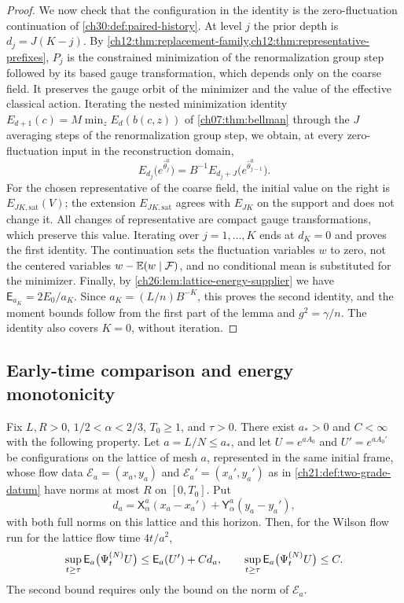 \begin{proof}
We now check that the configuration in the identity is the zero-fluctuation continuation of \cref{ch30:def:paired-history}. At level $j$ the prior depth is $d_j=J(K-j)$. By \cref{ch12:thm:replacement-family,ch12:thm:representative-prefixes}, $P_j$ is the constrained minimization of the renormalization group step followed by its based gauge transformation, which depends only on the coarse field. It preserves the gauge orbit of the minimizer and the value of the effective classical action. Iterating the nested minimization identity $E_{d+1}(c)=M\min_zE_d(b(c,z))$ of \cref{ch07:thm:bellman} through the $J$ averaging steps of the renormalization group step, we obtain, at every zero-fluctuation input in the reconstruction domain,
\[
 E_{d_j}\bigl(e^{\widehat\theta_j^0}\bigr)=B^{-1}E_{d_j+J}\bigl(e^{\widehat\theta_{j-1}^0}\bigr).
\]
For the chosen representative of the coarse field, the initial value on the right is $E_{JK,\mathrm{sat}}(V)$; the extension $E_{JK,\mathrm{sat}}$ agrees with $E_{JK}$ on the support and does not change it. All changes of representative are compact gauge transformations, which preserve this value. Iterating over $j=1,\ldots,K$ ends at $d_K=0$ and proves the first identity. The continuation sets the fluctuation variables $w$ to zero, not the centered variables $w-\mathbb E(w\mid\mathcal F)$, and no conditional mean is substituted for the minimizer. Finally, by \cref{ch26:lem:lattice-energy-supplier} we have $\mathsf E_{a_K}=2E_0/a_K$. Since $a_K=(L/n)B^{-K}$, this proves the second identity, and the moment bounds follow from the first part of the lemma and $g^2=\gamma/n$. The identity also covers $K=0$, without iteration.
\end{proof}

\subsection{Early-time comparison and energy monotonicity}

\begin{lemma}\label{ch30:lem:early-energy-domination}
Fix $L,R>0$, $1/2<\alpha<2/3$, $T_0\ge1$, and $\tau>0$. There exist $a_*>0$ and $C<\infty$ with the following property. Let $a=L/N\le a_*$, and let $U=e^{aA_0}$ and $U'=e^{aA_0'}$ be configurations on the lattice of mesh $a$, represented in the same initial frame, whose flow data $\mathcal E_a=(x_a,y_a)$ and $\mathcal E_a'=(x_a',y_a')$ as in \cref{ch21:def:two-grade-datum} have norms at most $R$ on $[0,T_0]$. Put
\[
 d_a=\mathsf X_\alpha^a(x_a-x_a')+\mathsf Y_\alpha^a(y_a-y_a'),
\]
with both full norms on this lattice and this horizon. Then, for the Wilson flow run for the lattice flow time $4t/a^2$,
\[
 \sup_{t\ge\tau}\mathsf E_a\bigl(\Psi^{(N)}_tU\bigr)\le\mathsf E_a(U')+Cd_a,\qquad\sup_{t\ge\tau}\mathsf E_a\bigl(\Psi^{(N)}_tU\bigr)\le C.
\]
The second bound requires only the bound on the norm of $\mathcal E_a$.
\end{lemma}

